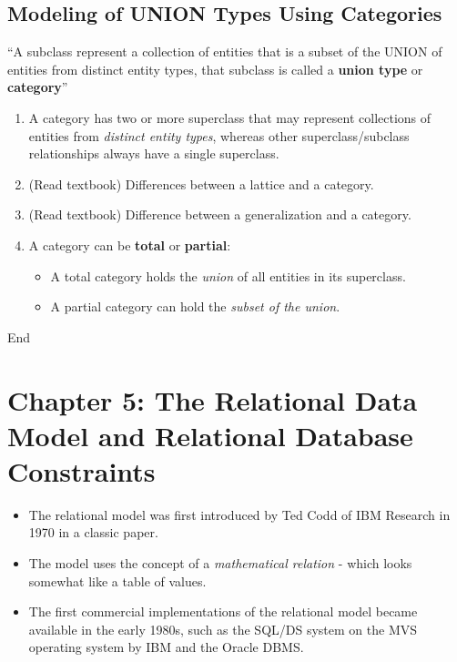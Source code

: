 \documentclass[10pt]{article}
\newcommand{\quotes}[1]{``#1''}
\newcommand{\tf}{\textbf}
\newcommand{\ti}{\textit}
\begin{document}
\subsection{Modeling of UNION Types Using Categories}

\quotes{A subclass represent a collection of entities that is a subset of the UNION of entities from distinct entity types, that subclass is called a \tf{union type} or \tf{category}}

\begin{enumerate}
	\item A category has two or more superclass that may represent collections of entities from \ti{distinct entity types}, whereas other superclass/subclass relationships always have a single superclass.
	\item (Read textbook) Differences between a lattice and a category.
	\item (Read textbook) Difference between a generalization and a category.
	\item A category can be \tf{total} or \tf{partial}:
	\begin{itemize}
		\item A total category holds the \ti{union} of all entities in its superclass.
		\item A partial category can hold the \ti{subset of the union}.
	\end{itemize}
\end{enumerate}

\begin{center}
	End
\end{center}
\pagebreak


\section{Chapter 5: The Relational Data Model and Relational Database Constraints}

\begin{itemize}
	\item The relational model was first introduced by Ted Codd of IBM Research in 1970 in a classic paper.
	\item The model uses the concept of a \ti{mathematical relation} - which looks somewhat like a table of values.
	\item The first commercial implementations of the relational model became available in the early 1980s, such as the SQL/DS system on the MVS operating system by IBM and the Oracle DBMS. 
\end{itemize}
\end{document}
